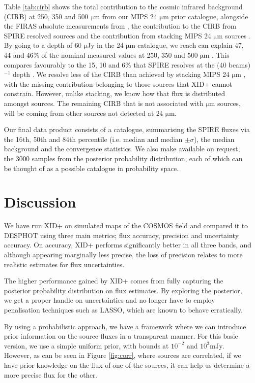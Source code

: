 \documentclass[useAMS,usenatbib]{mnras}
\begin{document}
Table \ref{tab:cirb} shows the total contribution to the cosmic infrared background (CIRB) at 250, 350 and 500 $\mathrm{\mu m}$ from our MIPS 24 $\mathrm{\mu m}$ prior catalogue, alongside the FIRAS absolute measurements from \cite{Lagache:2000}, the contribution to the CIRB from SPIRE resolved sources \citep{Oliver:2010} and the contribution from stacking MIPS 24 $\mathrm{\mu m}$ sources \citep{Bethermin:2012}. By going to a depth of 60 $\mathrm{\mu}$Jy in the 24 $\mathrm{\mu m}$ catalogue, we reach can explain 47, 44 and 46\% of the nominal measured values at 250, 350 and 500 $\mathrm{\mu m}$ \citep{Lagache:2000}. This compares favourably to the 15, 10 and 6\% that SPIRE resolves at the (40 beams)$^{-1}$ depth \citep{Oliver:2010}. We resolve less of the CIRB than achieved by stacking MIPS 24 $\mathrm{\mu m}$ , with the missing contribution belonging to those sources that \textsc{XID+} cannot constrain. However, unlike stacking, we know how that flux is distributed amongst sources. The remaining  CIRB that is not associated with $\mathrm{\mu m}$ sources, will be coming from other sources not detected at 24 $\mathrm{\mu m}$.

Our final data product consists of a catalogue, summarising the SPIRE fluxes via the 16th, 50th and 84th percentile (i.e. median and median $\pm \sigma$), the median background and the convergence statistics. We also make available on request, the 3000 samples from the posterior probability distribution, each of which can be thought of as a possible catalogue in probability space.

\section{Discussion}\label{sec:disc}
We have run \textsc{XID+} on simulated maps of the COSMOS field and compared it to \textsc{DESPHOT} using three main metrics; flux accuracy, precision and uncertainty accuracy. On accuracy, \textsc{XID+} performs significantly better in all three bands, and although appearing  marginally less precise, the loss of precision relates to more realistic estimates for flux uncertainties. 

The higher performance gained by \textsc{XID+} comes from fully capturing the posterior probability distribution on flux estimates. By exploring the posterior, we get a proper handle on uncertainties and no longer have to employ penalisation techniques such as LASSO, which are known to behave erratically.

By using a probabilistic approach, we have a framework where we can introduce prior information on the source fluxes in a transparent manner. For this basic version, we use a simple uniform prior, with bounds at $10^{-2}$ and $10^{3}\mathrm{mJy}$. However, as can be seen in Figure \ref{fig:corr}, where sources are correlated, if we have prior knowledge on the flux of one of the sources, it can help us determine a more precise flux for the other.
\end{document}
